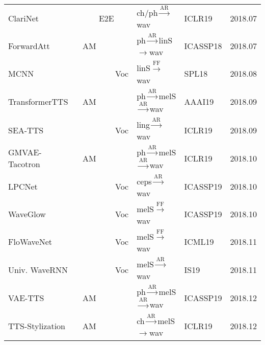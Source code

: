 \documentclass{article}
\begin{document}
\begin{center}
\begin{longtable}{l | l | l | l | l }
		ClariNet~\cite{ping2018clarinet}               & ~~~~E2E & {\color{blue}ch/ph}$\stackrel{\text{AR}}{\longrightarrow}$wav          & ICLR19 & 2018.07     \\
		ForwardAtt~\cite{zhang2018forward}               & AM & {\color{blue}ph}$\stackrel{\text{AR}}{\longrightarrow}${\color{red}linS}$\rightarrow$wav          & ICASSP18 & 2018.07     \\
		MCNN~\cite{arik2018fast}       & ~~~~~~~~Voc & {\color{red}linS}$\stackrel{\text{FF}}{\longrightarrow}$wav         & SPL18 & 2018.08     \\
		TransformerTTS~\cite{li2019neural} & AM  & {\color{blue}ph}$\stackrel{\text{AR}}{\longrightarrow}${\color{red}melS}$\stackrel{\text{AR}}{\longrightarrow}$wav  & AAAI19 &  2018.09        \\
		SEA-TTS~\cite{chen2018sample} & ~~~~~~~~Voc  & {\color{blue}ling}$\stackrel{\text{AR}}{\longrightarrow}$wav  & ICLR19 &  2018.09        \\
		GMVAE-Tacotron~\cite{hsu2018hierarchical} & AM  & {\color{blue}ph}$\stackrel{\text{AR}}{\longrightarrow}${\color{red}melS}$\stackrel{\text{AR}}{\longrightarrow}$wav  & ICLR19 &  2018.10        \\
		LPCNet~\cite{valin2019lpcnet}                 & ~~~~~~~~Voc      & {\color{red}ceps}$\stackrel{\text{AR}}{\longrightarrow}$wav           & ICASSP19 & 2018.10        \\
		WaveGlow~\cite{prenger2019waveglow}               & ~~~~~~~~Voc     & {\color{red}melS}$\stackrel{\text{FF}}{\longrightarrow}$wav   & ICASSP19 & 2018.10        \\
		FloWaveNet~\cite{kim2019flowavenet}             & ~~~~~~~~Voc      & {\color{red}melS}$\stackrel{\text{FF}}{\longrightarrow}$wav          &ICML19 & 2018.11        \\
		Univ. WaveRNN~\cite{lorenzo2019towards}             & ~~~~~~~~Voc      & {\color{red}melS}$\stackrel{\text{AR}}{\longrightarrow}$wav          &IS19 & 2018.11        \\
		VAE-TTS~\cite{zhang2019learningb}            & AM      & {\color{blue}ph}$\stackrel{\text{AR}}{\longrightarrow}${\color{red}melS}$\stackrel{\text{AR}}{\longrightarrow}$wav          &ICASSP19 & 2018.12        \\
		TTS-Stylization~\cite{ma2018neural}  & AM      & {\color{blue}ch}$\stackrel{\text{AR}}{\longrightarrow}${\color{red}melS}$\rightarrow$wav          &ICLR19 & 2018.12        \\

\end{longtable}
\end{center}
\end{document}
